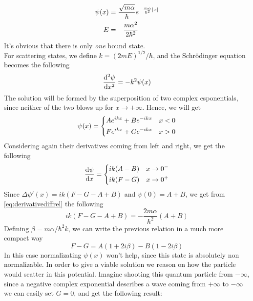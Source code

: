 \documentclass[../qm.tex]{subfiles}
\begin{document}
	\begin{equation}
		\begin{aligned}
			\psi(x)&=\frac{\sqrt{m\alpha}}{\hbar}e^{-\frac{m\alpha}{\hbar^2}\abs{x}}\\
			E&=-\frac{m\alpha^2}{2\hbar^2}
		\end{aligned}
		\label{eq:boundstatesdeltae}
	\end{equation}
	It's obvious that there is only \emph{one} bound state.\\
	For scattering states, we define $k=(2mE)^{1/2}/\hbar$, and the Schrödinger equation becomes the following
	\begin{equation}
		\derivative[2]{\psi}{x}=-k^2\psi(x)
		\label{eq:scatteringstateshamdelta}
	\end{equation}
	The solution will be formed by the superposition of two complex esponentials, since neither of the two blows up for $x\to\pm\infty$. Hence, we will get
	\begin{equation}
		\psi(x)=\begin{dcases}
			Ae^{ikx}+Be^{-ikx}&x<0\\
			Fe^{ikx}+Ge^{-ikx}&x>0
		\end{dcases}
		\label{eq:solution}
	\end{equation}
	Considering again their derivatives coming from left and right, we get the following
	\begin{equation}
		\derivative{\psi}{x}=\begin{dcases}
			ik(A-B)&x\to0^{-}\\
			ik(F-G)&x\to0^{+}
		\end{dcases}
		\label{eq:derivativecond}
	\end{equation}
	Since $\Delta\psi'(x)=ik(F-G-A+B)$ and $\psi(0)=A+B$, we get from \eqref{eq:derivativediffrel} the following
	\begin{equation*}
		ik\left( F-G-A+B \right)=-\frac{2m\alpha}{\hbar^2}\left( A+B \right)
	\end{equation*}
	Defining $\beta=m\alpha/\hbar^2k$, we can write the previous relation in a much more compact way
	\begin{equation}
		F-G=A(1+2i\beta)-B(1-2i\beta)
		\label{eq:coeffcondscattering}
	\end{equation}
	In this case normalizating $\psi(x)$ won't help, since this state is absolutely non normalizable. In order to give a viable solution we reason on how the particle would scatter in this potential. Imagine shooting this quantum particle from $-\infty$, since a negative complex exponential describes a wave coming from $+\infty$ to $-\infty$ we can easily set $G=0$, and get the following result:
\end{document}
